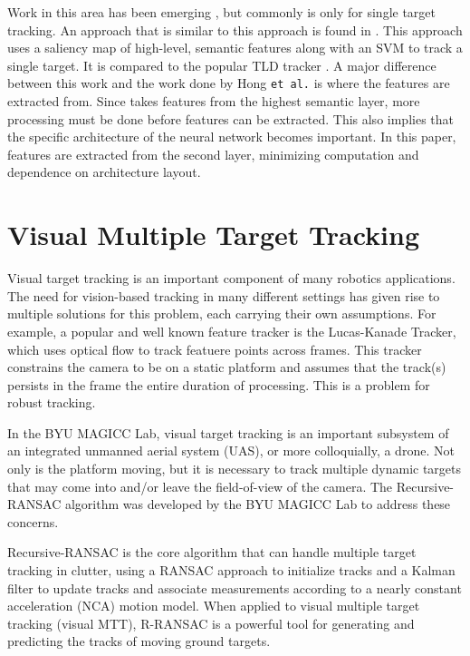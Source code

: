\documentclass[hidelinks]{article}
\begin{document}
Work in this area has been emerging \cite{Yosinski2014, Zhang2015, Li2016}, but commonly is only for single target tracking. An approach that is similar to this approach is found in \cite{Hong2015}. This approach uses a saliency map of high-level, semantic features along with an SVM to track a single target. It is compared to the popular TLD tracker \cite{Kalal2010}. A major difference between this work and the work done by Hong \texttt{et al.} is where the features are extracted from.  Since \cite{Hong2015} takes features from the highest semantic layer, more processing must be done before features can be extracted. This also implies that the specific architecture of the neural network becomes important. In this paper, features are extracted from the second layer, minimizing computation and dependence on architecture layout.


\section{Visual Multiple Target Tracking}
Visual target tracking is an important component of many robotics applications. The need for vision-based tracking in many different settings has given rise to multiple solutions for this problem, each carrying their own assumptions. For example, a popular and well known feature tracker is the Lucas-Kanade Tracker, which uses optical flow to track featuere points across frames. This tracker constrains the camera to be on a static platform and assumes that the track(s) persists in the frame the entire duration of processing. This is a problem for robust tracking.

In the BYU MAGICC Lab, visual target tracking is an important subsystem of an integrated unmanned aerial system (UAS), or more colloquially, a drone. Not only is the platform moving, but it is necessary to track multiple dynamic targets that may come into and/or leave the field-of-view of the camera. The Recursive-RANSAC \cite{Niedfeldt2014, Defranco2015} algorithm was developed by the BYU MAGICC Lab to address these concerns.

Recursive-RANSAC is the core algorithm that can handle multiple target tracking in clutter, using a RANSAC approach to initialize tracks and a Kalman filter to update tracks and associate measurements according to a nearly constant acceleration (NCA) motion model. When applied to visual multiple target tracking (visual MTT), R-RANSAC is a powerful tool for generating and predicting the tracks of moving ground targets.
\end{document}
